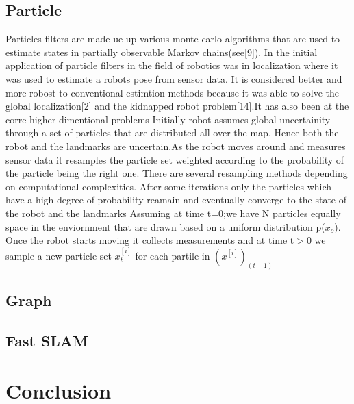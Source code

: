 \documentclass[conference]{IEEEtran}
\begin{document}
\subsection{Particle}
Particles filters are made ue up various monte carlo algorithms that are used to estimate states in partially observable Markov chains(see[9]). In the initial application of particle filters in the field of robotics was in localization where it was used to estimate a robots pose from sensor data. It is considered better and more robost to conventional estimtion methods because it was able to solve the global localization[2] and the kidnapped robot problem[14].It has also been at the corre higher dimentional problems  
Initially robot assumes global uncertainity through a set of particles that are distributed all over the map. Hence both the robot and the landmarks are uncertain.As the robot moves around and measures sensor data it resamples the particle set weighted according to the probability of the particle being the right one. There are several resampling methods depending on computational complexities. After some iterations only the particles which have a high degree of probability  reamain and eventually converge to the state of the robot and the landmarks
Assuming at time t=0;we have N particles equally space in the enviornment that are drawn based on a uniform distribution p($x_o$).
Once the robot starts moving it collects measurements and at time t$>$0 we sample a new particle set $x^[i]_t$ for each partile in $(x^[i])_(t-1)$

\subsection{Graph}
\subsection{Fast SLAM}



  

\section{Conclusion}


	
	
	
\end{document}
